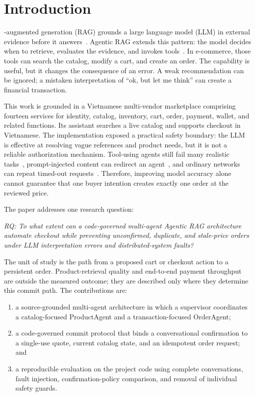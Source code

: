 \documentclass{IEEEtran}
\begin{document}
\section{Introduction}
\label{sec:introduction}

-augmented generation (RAG) grounds a large language model (LLM) in external evidence before it answers~\cite{lewis2020rag,gao2023ragsurvey}. Agentic RAG extends this pattern: the model decides when to retrieve, evaluates the evidence, and invokes tools~\cite{singh2025agenticrag,yao2023react}. In e-commerce, those tools can search the catalog, modify a cart, and create an order. The capability is useful, but it changes the consequence of an error. A weak recommendation can be ignored; a mistaken interpretation of ``ok, but let me think'' can create a financial transaction.

This work is grounded in a Vietnamese multi-vendor marketplace comprising fourteen services for identity, catalog, inventory, cart, order, payment, wallet, and related functions. Its assistant searches a live catalog and supports checkout in Vietnamese. The implementation exposed a practical safety boundary: the LLM is effective at resolving vague references and product needs, but it is not a reliable authorization mechanism. Tool-using agents still fail many realistic tasks~\cite{yao2024taubench}, prompt-injected content can redirect an agent~\cite{greshake2023injection}, and ordinary networks can repeat timed-out requests~\cite{helland2012idempotence}. Therefore, improving model accuracy alone cannot guarantee that one buyer intention creates exactly one order at the reviewed price.

The paper addresses one research question:

\emph{RQ: To what extent can a code-governed multi-agent Agentic RAG architecture automate checkout while preventing unconfirmed, duplicate, and stale-price orders under LLM interpretation errors and distributed-system faults?}

The unit of study is the path from a proposed cart or checkout action to a persistent order. Product-retrieval quality and end-to-end payment throughput are outside the measured outcome; they are described only where they determine this commit path. The contributions are:

\begin{enumerate}
\item a source-grounded multi-agent architecture in which a supervisor coordinates a catalog-focused ProductAgent and a transaction-focused OrderAgent;
\item a code-governed commit protocol that binds a conversational confirmation to a single-use quote, current catalog state, and an idempotent order request; and
\item a reproducible evaluation on the project code using complete conversations, fault injection, confirmation-policy comparison, and removal of individual safety guards.
\end{enumerate}
\end{document}
